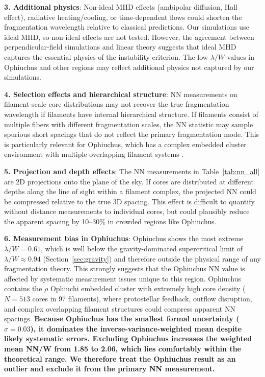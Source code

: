 \documentclass[twoside,twocolumn]{mnras}
\begin{document}
\textbf{3. Additional physics}: Non-ideal MHD effects (ambipolar diffusion, Hall effect), radiative heating/cooling, or time-dependent flows could shorten the fragmentation wavelength relative to classical predictions. Our simulations use ideal MHD, so non-ideal effects are not tested. However, the agreement between perpendicular-field simulations and linear theory suggests that ideal MHD captures the essential physics of the instability criterion. The low $\lambda/W$ values in Ophiuchus and other regions may reflect additional physics not captured by our simulations.

\textbf{4. Selection effects and hierarchical structure}: NN measurements on filament-scale core distributions may not recover the true fragmentation wavelength if filaments have internal hierarchical structure. If filaments consist of multiple fibers with different fragmentation scales, the NN statistic may sample spurious short spacings that do not reflect the primary fragmentation mode. This is particularly relevant for Ophiuchus, which has a complex embedded cluster environment with multiple overlapping filament systems \citep{Ladjelate2020}.

\textbf{5. Projection and depth effects}: The NN measurements in Table~\ref{tab:nn_all} are 2D projections onto the plane of the sky. If cores are distributed at different depths along the line of sight within a filament complex, the projected NN could be compressed relative to the true 3D spacing. This effect is difficult to quantify without distance measurements to individual cores, but could plausibly reduce the apparent spacing by 10--30\% in crowded regions like Ophiuchus.

\textbf{6. Measurement bias in Ophiuchus}: Ophiuchus shows the most extreme $\lambda/W = 0.61$, which is well below the gravity-dominated supercritical limit of $\lambda/W \approx 0.94$ (Section~\ref{sec:gravity}) and therefore outside the physical range of any fragmentation theory. This strongly suggests that the Ophiuchus NN value is affected by systematic measurement issues unique to this region. Ophiuchus contains the $\rho$ Ophiuchi embedded cluster with extremely high core density ($N = 513$ cores in 97 filaments), where protostellar feedback, outflow disruption, and complex overlapping filament structures \citep{Ladjelate2020} could compress apparent NN spacings. \textbf{Because Ophiuchus has the smallest formal uncertainty ($\sigma = 0.03$), it dominates the inverse-variance-weighted mean despite likely systematic errors. Excluding Ophiuchus increases the weighted mean NN/W from 1.85 to 2.06, which lies comfortably within the theoretical range. We therefore treat the Ophiuchus result as an outlier and exclude it from the primary NN measurement.}
\end{document}
